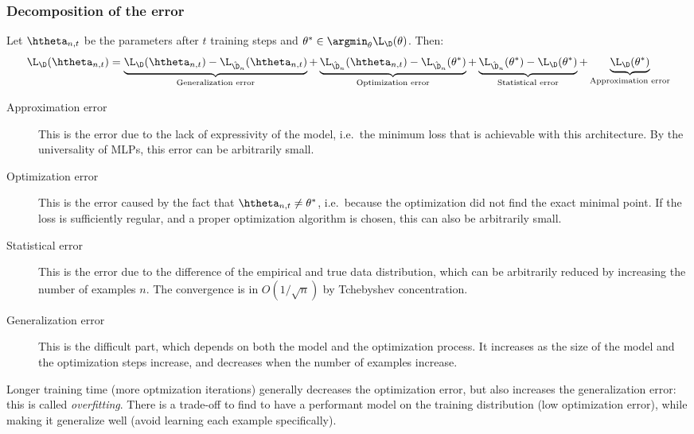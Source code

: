 \subsubsection{Decomposition of the error}
\begin{property}
    Let $\htheta_{n,t}$ be the parameters after $t$ training steps and $\theta^*\in\argmin_\theta\L_\D(\theta)$. Then:
    \begin{equation*}
        \L_\D(\htheta_{n,t})=
        \underbrace{\L_\D(\htheta_{n,t}) - \L_{\hat{\D}_n}(\htheta_{n,t})}_{\textnormal{Generalization error}}
        + \underbrace{\L_{\hat{\D}_n}(\htheta_{n,t}) - \L_{\hat{\D}_n}(\theta^*)}_{\textnormal{Optimization error}}
        + \underbrace{\L_{\hat{\D}_n}(\theta^*) - \L_\D(\theta^*)}_{\textnormal{Statistical error}}
        + \underbrace{\L_\D(\theta^*)}_{\textnormal{Approximation error}}
    \end{equation*}
\end{property}
\begin{description}
    \item[Approximation error] This is the error due to the lack of expressivity of the model, i.e.~the minimum loss that is achievable with this architecture. By the universality of MLPs, this error can be arbitrarily small.
    \item[Optimization error] This is the error caused by the fact that $\htheta_{n,t}\neq\theta^*$, i.e.~because the optimization did not find the exact minimal point. If the loss is sufficiently regular, and a proper optimization algorithm is chosen, this can also be arbitrarily small.
    \item[Statistical error] This is the error due to the difference of the empirical and true data distribution, which can be arbitrarily reduced by increasing the number of examples $n$. The convergence is in $O(1/\sqrt{n})$ by Tchebyshev concentration.
    \item[Generalization error] This is the difficult part, which depends on both the model and the optimization process. It increases as the size of the model and the optimization steps increase, and decreases when the number of examples increase.
\end{description}

Longer training time (more optmization iterations) generally decreases the optimization error, but also increases the generalization error: this is called \emph{overfitting}. There is a trade-off to find to have a performant model on the training distribution (low optimization error), while making it generalize well (avoid learning each example specifically).

